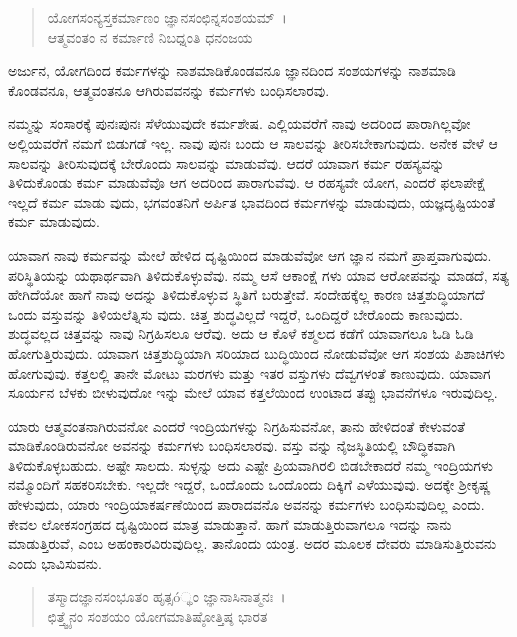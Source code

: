 \begin{verse}
ಯೋಗಸಂನ್ಯಸ್ತಕರ್ಮಾಣಂ ಜ್ಞಾನಸಂಛಿನ್ನಸಂಶಯಮ್~।\\ಆತ್ಮವಂತಂ ನ ಕರ್ಮಾಣಿ ನಿಬಧ್ನಂತಿ ಧನಂಜಯ 
\end{verse}

{\small ಅರ್ಜುನ, ಯೋಗದಿಂದ ಕರ್ಮಗಳನ್ನು ನಾಶಮಾಡಿಕೊಂಡವನೂ ಜ್ಞಾನದಿಂದ ಸಂಶಯಗಳನ್ನು ನಾಶಮಾಡಿ ಕೊಂಡವನೂ, ಆತ್ಮವಂತನೂ ಆಗಿರುವವನನ್ನು ಕರ್ಮಗಳು ಬಂಧಿಸಲಾರವು.}

ನಮ್ಮನ್ನು ಸಂಸಾರಕ್ಕೆ ಪುನಃಪುನಃ ಸೆಳೆಯುವುದೇ ಕರ್ಮಶೇಷ. ಎಲ್ಲಿಯವರೆಗೆ ನಾವು ಅದರಿಂದ ಪಾರಾಗಿಲ್ಲವೋ ಅಲ್ಲಿಯವರೆಗೆ ನಮಗೆ ಬಿಡುಗಡೆ ಇಲ್ಲ. ನಾವು ಪುನಃ ಬಂದು ಆ ಸಾಲವನ್ನು ತೀರಿಸಬೇಕಾಗುವುದು. ಅನೇಕ ವೇಳೆ ಆ ಸಾಲವನ್ನು ತೀರಿಸುವುದಕ್ಕೆ ಬೇರೊಂದು ಸಾಲವನ್ನು ಮಾಡುವೆವು. ಆದರೆ ಯಾವಾಗ ಕರ್ಮ ರಹಸ್ಯವನ್ನು ತಿಳಿದುಕೊಂಡು ಕರ್ಮ ಮಾಡುವೆವೊ ಆಗ ಅದರಿಂದ ಪಾರಾಗುವೆವು. ಆ ರಹಸ್ಯವೇ ಯೋಗ, ಎಂದರೆ ಫಲಾಪೇಕ್ಷೆ ಇಲ್ಲದೆ ಕರ್ಮ ಮಾಡು ವುದು, ಭಗವಂತನಿಗೆ ಅರ್ಪಿತ ಭಾವದಿಂದ ಕರ್ಮಗಳನ್ನು ಮಾಡುವುದು, ಯಜ್ಞದೃಷ್ಟಿಯಂತೆ ಕರ್ಮ ಮಾಡುವುದು.

ಯಾವಾಗ ನಾವು ಕರ್ಮವನ್ನು ಮೇಲೆ ಹೇಳಿದ ದೃಷ್ಟಿಯಿಂದ ಮಾಡುವೆವೋ ಆಗ ಜ್ಞಾನ ನಮಗೆ ಪ್ರಾಪ್ತವಾಗುವುದು. ಪರಿಸ್ಥಿತಿಯನ್ನು ಯಥಾರ್ಥವಾಗಿ ತಿಳಿದುಕೊಳ್ಳುವೆವು. ನಮ್ಮ ಆಸೆ ಆಕಾಂಕ್ಷೆ ಗಳು ಯಾವ ಆರೋಪವನ್ನು ಮಾಡದೆ, ಸತ್ಯ ಹೇಗಿದೆಯೋ ಹಾಗೆ ನಾವು ಅದನ್ನು ತಿಳಿದುಕೊಳ್ಳುವ ಸ್ಥಿತಿಗೆ ಬರುತ್ತೇವೆ. ಸಂದೇಹಕ್ಕೆಲ್ಲ ಕಾರಣ ಚಿತ್ತಶುದ್ಧಿಯಾಗದೆ ಒಂದು ವಸ್ತುವನ್ನು ತಿಳಿಯಲೆತ್ನಿಸು ವುದು. ಚಿತ್ತ ಶುದ್ಧವಿಲ್ಲದೆ ಇದ್ದರೆ, ಒಂದಿದ್ದರೆ ಬೇರೊಂದು ಕಾಣುವುದು. ಶುದ್ಧವಲ್ಲದ ಚಿತ್ತವನ್ನು ನಾವು ನಿಗ್ರಹಿಸಲೂ ಆರೆವು. ಅದು ಆ ಕೊಳೆ ಕಶ್ಮಲದ ಕಡೆಗೆ ಯಾವಾಗಲೂ ಓಡಿ ಓಡಿ ಹೋಗುತ್ತಿರುವುದು. ಯಾವಾಗ ಚಿತ್ತಶುದ್ಧಿಯಾಗಿ ಸರಿಯಾದ ಬುದ್ಧಿಯಿಂದ ನೋಡುವೆವೋ ಆಗ ಸಂಶಯ ಪಿಶಾಚಿಗಳು ಹೋಗುವುವು. ಕತ್ತಲಲ್ಲಿ ತಾನೇ ಮೋಟು ಮರಗಳು ಮತ್ತು ಇತರ ವಸ್ತುಗಳು ದೆವ್ವಗಳಂತೆ ಕಾಣುವುದು. ಯಾವಾಗ ಸೂರ್ಯನ ಬೆಳಕು ಬೀಳುವುದೋ ಇನ್ನು ಮೇಲೆ ಯಾವ ಕತ್ತಲೆಯಿಂದ ಉಂಟಾದ ತಪ್ಪು ಭಾವನೆಗಳೂ ಇರುವುದಿಲ್ಲ.

ಯಾರು ಆತ್ಮವಂತನಾಗಿರುವನೋ ಎಂದರೆ ಇಂದ್ರಿಯಗಳನ್ನು ನಿಗ್ರಹಿಸುವನೋ, ತಾನು ಹೇಳಿದಂತೆ ಕೇಳುವಂತೆ ಮಾಡಿಕೊಂಡಿರುವನೋ ಅವನನ್ನು ಕರ್ಮಗಳು ಬಂಧಿಸಲಾರವು. ವಸ್ತು ವನ್ನು ನೈಜಸ್ಥಿತಿಯಲ್ಲಿ ಬೌದ್ಧಿಕವಾಗಿ ತಿಳಿದುಕೊಳ್ಳಬಹುದು. ಅಷ್ಟೇ ಸಾಲದು. ಸುಳ್ಳನ್ನು ಅದು ಎಷ್ಟೇ ಪ್ರಿಯವಾಗಿರಲಿ ಬಿಡಬೇಕಾದರೆ ನಮ್ಮ ಇಂದ್ರಿಯಗಳು ನಮ್ಮೊಂದಿಗೆ ಸಹಕರಿಸಬೇಕು. ಇಲ್ಲದೇ ಇದ್ದರೆ, ಒಂದೊಂದು ಒಂದೊಂದು ದಿಕ್ಕಿಗೆ ಎಳೆಯುವುವು. ಅದಕ್ಕೇ ಶ‍್ರೀಕೃಷ್ಣ ಹೇಳುವುದು, ಯಾರು ಇಂದ್ರಿಯಾಕರ್ಷಣೆಯಿಂದ ಪಾರಾದವನೊ ಅವನನ್ನು ಕರ್ಮಗಳು ಬಂಧಿಸುವುದಿಲ್ಲ ಎಂದು. ಕೇವಲ ಲೋಕಸಂಗ್ರಹದ ದೃಷ್ಟಿಯಿಂದ ಮಾತ್ರ ಮಾಡುತ್ತಾನೆ. ಹಾಗೆ ಮಾಡುತ್ತಿರುವಾಗಲೂ ಇದನ್ನು ನಾನು ಮಾಡುತ್ತಿರುವೆ, ಎಂಬ ಅಹಂಕಾರವಿರುವುದಿಲ್ಲ. ತಾನೊಂದು ಯಂತ್ರ. ಅದರ ಮೂಲಕ ದೇವರು ಮಾಡಿಸುತ್ತಿರುವನು ಎಂದು ಭಾವಿಸುವನು.\\

\begin{verse}
ತಸ್ಮಾದಜ್ಞಾನಸಂಭೂತಂ ಹೃತ್ಸó್ಥಂ ಜ್ಞಾನಾಸಿನಾತ್ಮನಃ~।\\ಛಿತ್ತ್ವೈನಂ ಸಂಶಯಂ ಯೋಗಮಾತಿಷ್ಠೋತ್ತಿಷ್ಠ ಭಾರತ 
\end{verse}

